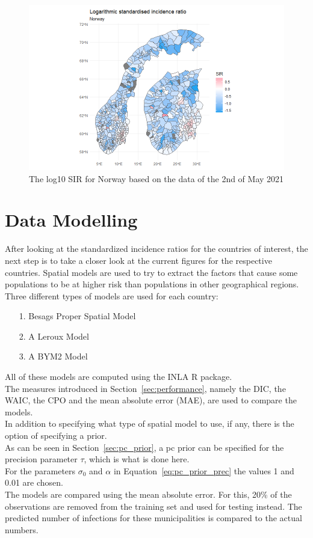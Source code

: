 \begin{figure}[H]
 \centering
 \includegraphics[width = 1.2\textwidth]{sir_norway_log.png}
 \caption{The log10 SIR for Norway based on the data of the 2nd of May 2021}
 \label{sirnorwaylog}
\end{figure}
\clearpage
\section{Data Modelling}
After looking at the standardized incidence ratios for the countries of interest, the next step is to take a closer look at the current figures for the respective countries. Spatial models are used to try to extract the factors that cause some populations to be at higher risk than populations in other geographical regions. Three different types of models are used for each country:
\begin{itemize}
  \item[1.] Besags Proper Spatial Model
  \item[2.] A Leroux Model
  \item[3.] A BYM2 Model
\end{itemize}
All of these models are computed using the INLA \autocite[][]{rinla} R package. \\
The measures introduced in Section~\ref{sec:performance}, namely the DIC, the WAIC, the CPO and the mean absolute error (MAE), are used to compare the models.\\
In addition to specifying what type of spatial model to use, if any, there is the option of specifying a prior. \\
As can be seen in Section~\ref{sec:pc_prior}, a pc prior can be specified for the precision parameter $\tau$, which is what is done here. \\
For the parameters $\sigma_0$ and $\alpha$ in Equation~\ref{eq:pc_prior_prec} the values 1 and 0.01 are chosen. \\
The models are compared using the mean absolute error. For this, 20\% of the observations are removed from the training set and used for testing instead. The predicted number of infections for these municipalities is compared to the actual numbers.
